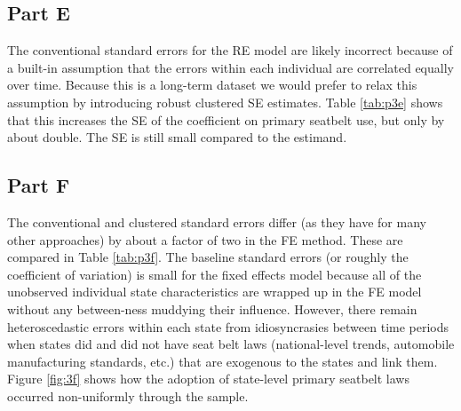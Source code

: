 \documentclass[letterpaper, 12pt]{article}
\begin{document}
\subsection{Part E}

The conventional standard errors for the RE model are likely incorrect because of a built-in assumption that the errors within each individual are correlated equally over time.  Because this is a long-term dataset we would prefer to relax this assumption by introducing robust clustered SE estimates.  Table \ref{tab:p3e} shows that this increases the SE of the coefficient on primary seatbelt use, but only by about double.  The SE is still small compared to the estimand.



\subsection{Part F}

The conventional and clustered standard errors differ (as they have for many other approaches) by about a factor of two in the FE method.  These are compared in Table \ref{tab:p3f}.  The baseline standard errors (or roughly the coefficient of variation) is small for the fixed effects model because all of the unobserved individual state characteristics are wrapped up in the FE model without any between-ness muddying their influence.  However, there remain heteroscedastic errors within each state from idiosyncrasies  between time periods when states did and did not have seat belt laws (national-level trends, automobile manufacturing standards, etc.) that are exogenous to the states and link them.  Figure \ref{fig:3f} shows how the adoption of state-level primary seatbelt laws occurred non-uniformly through the sample.


\end{document}
